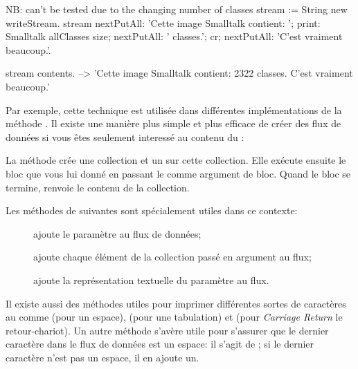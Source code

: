 \documentclass[a4paper,10pt,twoside]{book}
\begin{document}
\begin{code}{NB: can't be tested due to the changing number of classes}
stream := String new writeStream.
stream
  nextPutAll: 'Cette image Smalltalk contient: ';
  print: Smalltalk allClasses size;
  nextPutAll: ' classes.';
  cr;
  nextPutAll: 'C'est vraiment beaucoup.'.

stream contents. --> 'Cette image Smalltalk contient: 2322 classes.
C'est vraiment beaucoup.'
\end{code}

Par exemple, cette technique est utilis\'ee dans diff\'erentes 
impl\'ementations de la m\'ethode . Il existe une mani\`ere
plus simple et plus efficace de cr\'eer des flux de donn\'ees si vous \^etes
seulement interess\'e au contenu du \stream:


La m\'ethode  \label{sec:streamContents} cr\'ee une collection et un \stream sur cette collection.
Elle ex\'ecute ensuite le bloc que vous lui donn\'e en passant le \stream comme argument de bloc. Quand le bloc se termine, 
renvoie le contenu de la collection.

Les m\'ethodes de  suivantes sont sp\'ecialement utiles dans ce contexte:

\begin{description}
\item[] ajoute le param\`etre au flux de donn\'ees;
\item[] ajoute chaque \'el\'ement de la collection pass\'e en argument au flux;
\item[] ajoute la repr\'esentation textuelle du param\`etre au flux.
\end{description}

Il existe aussi des m\'ethodes utiles pour imprimer diff\'erentes sortes
de caract\`eres au \stream comme  (pour un espace), 
    (pour une tabulation) et
 (pour \emph{Carriage Return} \cad le retour-chariot).
Un autre m\'ethode s'av\`ere utile pour s'assurer que le dernier caract\`ere
dans le flux de donn\'ees est un espace: il s'agit de ; si le dernier caract\`ere n'est pas un espace, il en ajoute un.
\end{document}
